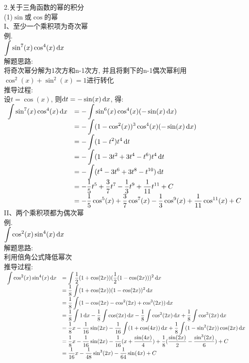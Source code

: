 2.关于三角函数的幂的积分\\
(1)$\sin$或$\cos$的幂\\
I、至少一个乘积项为奇次幂\\
例.\\
$\displaystyle\int\sin^7(x)\cos^4(x)\mathop{}\!\mathrm{d} x$\\
解题思路:\\
将奇次幂分解为1次方和n-1次方, 并且将剩下的n-1偶次幂利用$\cos^2(x)+\sin^2(x)=1$进行转化\\
推导过程:\\
设$t=\cos(x)$, 则$\mathop{}\!\mathrm{d} t=-\sin(x)\mathop{}\!\mathrm{d} x$, 得:\\
\(\begin{array}{>{\displaystyle}r >{\displaystyle}l}
\int\sin^7(x)\cos^4(x)\dif x & =-\int\sin^6(x)\cos^4(x)(-\sin(x)\dif x)\\
& =-\int(1-\cos^2(x))^3\cos^4(x)(-\sin(x)\dif x)\\
& =-\int(1-t^2)t^4\dif t\\
& =-\int(1-3t^2+3t^4-t^6)t^4\dif t\\
& =-\int(t^4-3t^6+3t^8-t^{10})\dif t\\
& =-\dfrac{1}{5}t^5+\dfrac{3}{7}t^7-\dfrac{1}{3}t^9+\dfrac{1}{11}t^{11}+C\\[1ex]
& =-\dfrac{1}{5}\cos^5(x)+\dfrac{3}{7}\cos^7(x)-\dfrac{1}{3}\cos^9(x)+\dfrac{1}{11}\cos^{11}(x)+C
\end{array}\)\\[2ex]

II、两个乘积项都为偶次幂\\
例.\\
$\displaystyle\int\cos^2(x)\sin^4(x)\mathop{}\!\mathrm{d} x$\\
解题思路:\\
利用倍角公式降低幂次\\
推导过程:\\
\(\begin{array}{>{\displaystyle}r >{\displaystyle}l}
\int\cos^2(x)\sin^4(x)\dif x & =\int\dfrac{1}{2}(1+\cos(2x))(\dfrac{1}{2}(1-\cos(2x)))^2\dif x\\[1ex]
& =\dfrac{1}{8}\int(1+\cos(2x))(1-\cos(2x))^2\dif x\\[1ex]
& =\dfrac{1}{8}\int(1-\cos(2x)-\cos^2(2x)+\cos^3(2x))\dif x\\[1ex]
& =\dfrac{1}{8}\int 1\dif x-\dfrac{1}{8}\int\cos(2x)\dif x-\dfrac{1}{8}\int\cos^2(2x)\dif x+\dfrac{1}{8}\int\cos^3(2x)\dif x\\[1ex]
& =\dfrac{1}{8}x-\dfrac{1}{16}\sin(2x)-\dfrac{1}{16}\int(1+\cos(4x))\dif x+\dfrac{1}{8}\int(1-\sin^2(2x))\cos(2x)\dif x\\[1ex]
& =\dfrac{1}{8}x-\dfrac{1}{16}\sin(2x)-\dfrac{1}{16}(x+\dfrac{\sin(4x)}{4})+\dfrac{1}{8}(\dfrac{\sin(2x)}{2}-\dfrac{\sin^3(2x)}{6})+C\\[1ex]
& =\dfrac{1}{16}x-\dfrac{1}{48}\sin^3(2x)-\dfrac{1}{64}\sin(4x)+C
\end{array}\)\\[2ex]

